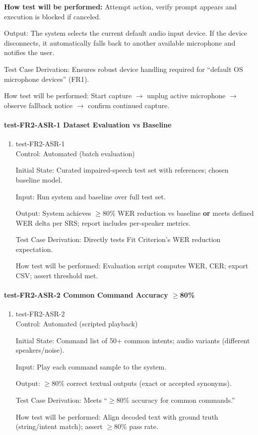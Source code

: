 \documentclass[12pt, titlepage]{article}
\begin{document}
\begin{enumerate}
\textbf{How test will be performed:} Attempt action, verify prompt appears and execution is blocked if canceled.

Output: The system selects the current default audio input device. If the device disconnects, it automatically falls back to another available microphone and notifies the user.

Test Case Derivation: Ensures robust device handling required for “default OS microphone devices” (FR1).

How test will be performed: Start capture $\rightarrow$ unplug active microphone $\rightarrow$ observe fallback notice $\rightarrow$ confirm continued capture.
\end{enumerate}

\paragraph{test-FR2-ASR-1 Dataset Evaluation vs Baseline}

\begin{enumerate}
\item{test-FR2-ASR-1\\}
Control: Automated (batch evaluation)

Initial State: Curated impaired-speech test set with references; chosen baseline model.

Input: Run system and baseline over full test set.

Output: System achieves $\geq$80\% WER reduction vs baseline \textbf{or} meets defined WER delta per SRS; report includes per-speaker metrics.

Test Case Derivation: Directly tests Fit Criterion’s WER reduction expectation.

How test will be performed: Evaluation script computes WER, CER; export CSV; assert threshold met.
\end{enumerate}

\paragraph{test-FR2-ASR-2 Common Command Accuracy $\geq$80\%}

\begin{enumerate}
\item{test-FR2-ASR-2\\}
Control: Automated (scripted playback)

Initial State: Command list of 50+ common intents; audio variants (different speakers/noise).

Input: Play each command sample to the system.

Output: $\geq$80\% correct textual outputs (exact or accepted synonyms).

Test Case Derivation: Meets “$\geq$80\% accuracy for common commands.”

How test will be performed: Align decoded text with ground truth (string/intent match); assert $\geq$80\% pass rate.
\end{enumerate}
\end{document}
